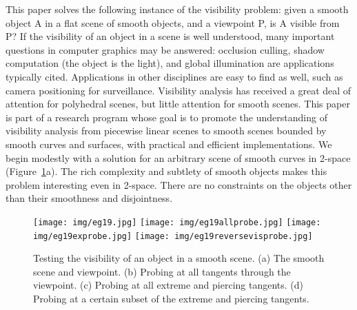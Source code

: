 \documentclass[10pt,twocolumn]{article}
\newif\ifJournal
\begin{document}
This paper solves the following instance of the visibility problem:
given a smooth object A in a flat scene of smooth objects, and a viewpoint P,
is A visible from P?
If the visibility of an object in a scene is well understood, many important questions
in computer graphics may be answered:
occlusion culling, shadow computation (the object is the light), 
and global illumination are applications typically cited.
Applications in other disciplines are easy
to find as well, such as camera positioning for surveillance.
Visibility analysis has received a great deal of attention for polyhedral scenes,
but little attention for smooth scenes.
This paper is part of a research program whose goal is to promote the
understanding of visibility analysis from piecewise linear scenes 
to smooth scenes bounded by smooth curves and surfaces,
with practical and efficient implementations.
We begin modestly with a solution 
for an arbitrary scene of smooth curves in 2-space (Figure~\ref{fig:eg19probe}a).
The rich complexity and subtlety of smooth objects makes this problem
interesting even in 2-space.
There are no constraints on the objects other than their
smoothness and disjointness.

\ifJournal %
\fi

\begin{figure}
\begin{center}
\texttt{[image: img/eg19.jpg]}
\texttt{[image: img/eg19allprobe.jpg]}
\texttt{[image: img/eg19exprobe.jpg]}
\texttt{[image: img/eg19reversevisprobe.jpg]}
\end{center}
\caption{Testing the visibility of an object in a smooth scene.
         (a) The smooth scene and viewpoint.
         (b) Probing at all tangents through the viewpoint.
         (c) Probing at all extreme and piercing tangents.
         (d) Probing at a certain subset of the extreme and piercing tangents.}
\label{fig:eg19probe}
\end{figure}
\end{document}
